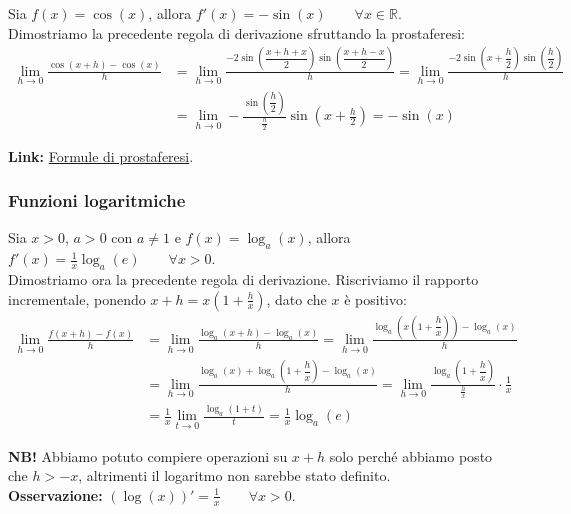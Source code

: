 \documentclass{article}
\begin{document}
\noindent Sia $f(x) = \cos(x)$, allora $f'(x) = -\sin(x) \qquad \forall x \in \mathbb{R}$. \\

\noindent Dimostriamo la precedente regola di derivazione sfruttando la prostaferesi:
\begin{align*}
    \lim_{h \to 0} \frac{\cos(x + h) - \cos(x)}{h} &= \lim_{h \to 0}\frac{-2\sin\left(\dfrac{x + h + x}{2}\right)\sin\left(\dfrac{x + h - x}{2}\right)}{h} = \lim_{h \to 0} \frac{-2\sin\left(x + \dfrac{h}{2}\right)\sin\left(\dfrac{h}{2}\right)}{h}\\
    &= \lim_{h \to 0} - \frac{\sin\left(\dfrac{h}{2}\right)}{\frac{h}{2}}\sin\left(x + \frac{h}{2}\right) = -\sin(x)
\end{align*}

\noindent\textbf{Link:} \href{https://www.youmath.it/formulari/65-formulari-di-trigonometria-logaritmi-esponenziali/1048-formule-di-prostaferesi.html}{Formule di prostaferesi}.

\subsubsection{Funzioni logaritmiche}
Sia $x > 0$, $a > 0$ con $a \neq 1$ e $f(x) = \log_a(x)$, allora $f'(x) = \frac{1}{x} \log_a(e) \qquad \forall x > 0$.\\

\noindent Dimostriamo ora la precedente regola di derivazione. Riscriviamo il rapporto incrementale, ponendo $x + h = x(1 + \frac{h}{x})$, dato che $x$ è positivo:
\begin{align*}
    \lim_{h \to 0} \frac{f(x + h) - f(x)}{h} &= \lim_{h \to 0} \frac{\log_a(x + h) - \log_a(x)}{h} = \lim_{h \to 0} \frac{\log_a\left(x\left(1 + \dfrac{h}{x}\right)\right) - \log_a(x)}{h}\\
    &= \lim_{h \to 0} \frac{\log_a(x) + \log_a\left(1 + \dfrac{h}{x}\right) - \log_a(x)}{h} = \lim_{h \to 0} \frac{\log_a\left(1 + \dfrac{h}{x}\right)}{\frac{h}{x}} \cdot \frac{1}{x} \\
    &= \frac{1}{x} \lim_{t \to 0}\frac{\log_a(1 + t)}{t} = \frac{1}{x} \log_a(e)
\end{align*}

\noindent\textbf{NB!} Abbiamo potuto compiere operazioni su $x + h$ solo perché abbiamo posto che $h > -x$, altrimenti il logaritmo non sarebbe stato definito.\\

\noindent\textbf{Osservazione:} $(\log(x))' = \frac{1}{x} \qquad \forall x > 0$.\\
\end{document}
